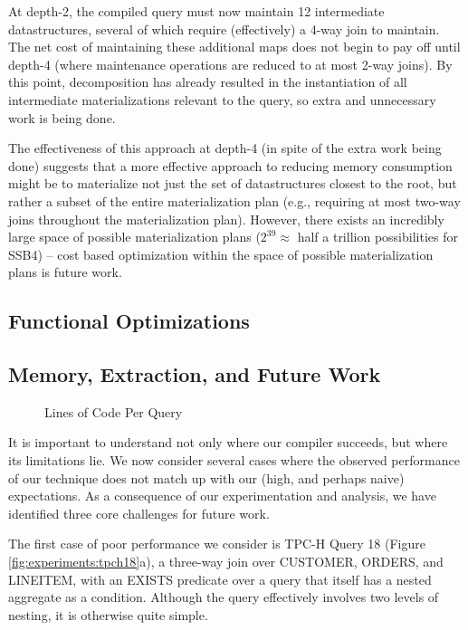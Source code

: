 At depth-2, the compiled query must now maintain 12 intermediate datastructures, several of which require (effectively) a 4-way join to maintain.  The net cost of maintaining these additional maps does not begin to pay off until depth-4 (where maintenance operations are reduced to at most 2-way joins).  By this point, decomposition has already resulted in the instantiation of all intermediate materializations relevant to the query, so extra and unnecessary work is being done.  

The effectiveness of this approach at depth-4 (in spite of the extra work being done) suggests that a more effective approach to reducing memory consumption might be to materialize not just the set of datastructures closest to the root, but rather a subset of the entire materialization plan (e.g., requiring at most two-way joins throughout the materialization plan).  However, there exists an incredibly large space of possible materialization plans ($2^{39} \approx $ half a trillion possibilities for SSB4) -- cost based optimization within the space of possible materialization plans is future work.

\subsection{Functional Optimizations}

\subsection{Memory, Extraction, and Future Work}
\label{sec:experiments:future}

\begin{figure}
\begin{center}

\caption{Lines of Code Per Query}
\label{fig:experiments:loc}
\end{center}
\end{figure}

It is important to understand not only where our compiler succeeds, but where its limitations lie.  We now consider several cases where the observed performance of our technique does not match up with our (high, and perhaps naive) expectations.  As a consequence of our experimentation and analysis, we have identified three core challenges for future work.

The first case of poor performance we consider is TPC-H Query 18 (Figure \ref{fig:experiments:tpch18}a), a three-way join over CUSTOMER, ORDERS, and LINEITEM, with an EXISTS predicate over a query that itself has a nested aggregate as a condition.  Although the query effectively involves two levels of nesting, it is otherwise quite simple.

